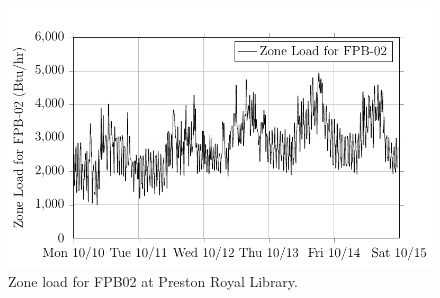 \begin{figure}
\centering
\includegraphics[]{Plots/2017-04-03-1250-ZoneLoadforFPB02-TikzData.pdf}
\caption{Zone load for FPB02 at Preston Royal Library.}
\label{fig:2017-04-03-1250-ZoneLoadforFPB02-TikzData}
\end{figure}
